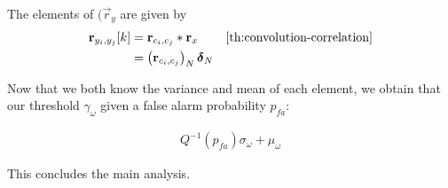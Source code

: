 \documentclass[a4paper, openany, oneside]{memoir}
\begin{document}
The elements of $(\vec{r}_y$ are given by 
\begin{align*}
\vec{r}_{y_i, y_j}[k] &= \vec{r}_{c_i,c_j} \ast \vec{r}_x & \text{\cref{th:convolution-correlation}} \\
&=  \left( \vec{r}_{c_i,c_j}\right)_N  \vec{\delta}_N
\end{align*}

Now that we both know the variance and mean of each element, we obtain that our threshold $\gamma_{\omega}$ given a false alarm probability $p_{fa}$:

\begin{align*}
Q^{-1}(p_{fa})\sigma_{\omega} + \mu_{\omega}
\end{align*}

This concludes the main analysis.
\end{document}
